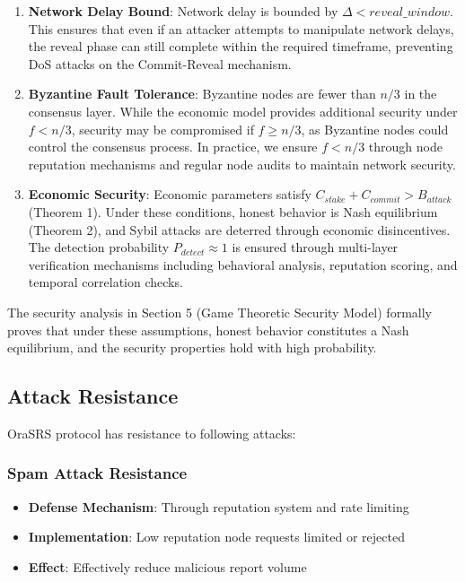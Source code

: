 \documentclass[12pt]{article}
\begin{document}
\begin{enumerate}
\item \textbf{Network Delay Bound}: Network delay is bounded by $\Delta < reveal\_window$. This ensures that even if an attacker attempts to manipulate network delays, the reveal phase can still complete within the required timeframe, preventing DoS attacks on the Commit-Reveal mechanism.
\item \textbf{Byzantine Fault Tolerance}: Byzantine nodes are fewer than $n/3$ in the consensus layer. While the economic model provides additional security under $f < n/3$, security may be compromised if $f \geq n/3$, as Byzantine nodes could control the consensus process. In practice, we ensure $f < n/3$ through node reputation mechanisms and regular node audits to maintain network security.
\item \textbf{Economic Security}: Economic parameters satisfy $C_{stake} + C_{commit} > B_{attack}$ (Theorem 1). Under these conditions, honest behavior is Nash equilibrium (Theorem 2), and Sybil attacks are deterred through economic disincentives. The detection probability $P_{detect} \approx 1$ is ensured through multi-layer verification mechanisms including behavioral analysis, reputation scoring, and temporal correlation checks.
\end{enumerate}

The security analysis in Section 5 (Game Theoretic Security Model) formally proves that under these assumptions, honest behavior constitutes a Nash equilibrium, and the security properties hold with high probability.

\subsection{Attack Resistance}

OraSRS protocol has resistance to following attacks:

\subsubsection{Spam Attack Resistance}
\begin{itemize}
\item \textbf{Defense Mechanism}: Through reputation system and rate limiting
\item \textbf{Implementation}: Low reputation node requests limited or rejected
\item \textbf{Effect}: Effectively reduce malicious report volume
\end{itemize}
\end{document}
